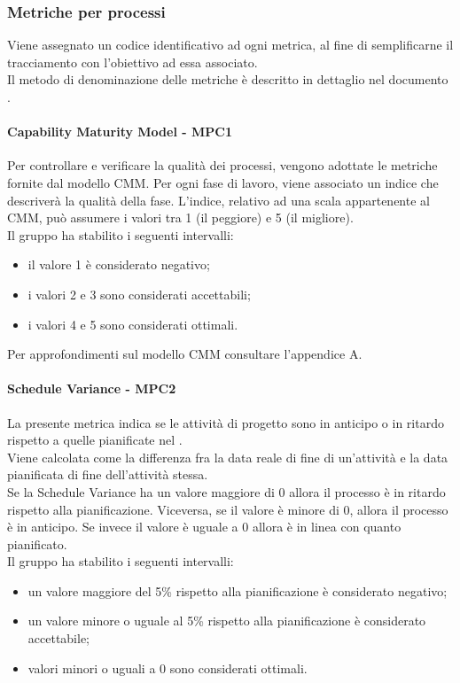 \documentclass[PianoDiQualifica.tex]{subfiles}
\begin{document}
		\subsubsection{Metriche per processi}
		Viene assegnato un codice identificativo ad ogni metrica, al fine di semplificarne il tracciamento con l'obiettivo ad essa associato. \\
		Il metodo di denominazione delle metriche è descritto in dettaglio nel documento \NPdocRR{}.
		
			\hypertarget{CMM_m}{\paragraph{Capability Maturity Model - MPC1}}
			Per controllare e verificare la qualità dei processi, vengono adottate le metriche fornite dal modello CMM.
			Per ogni fase di lavoro, viene associato un indice che descriverà la qualità della fase.
			L'indice, relativo ad una scala appartenente al CMM, può assumere i valori tra 1 (il peggiore) e 5 (il migliore). \\
			Il gruppo ha stabilito i seguenti intervalli:
			\begin{itemize}
				\item il valore 1 è considerato negativo;
				\item i valori 2 e 3 sono considerati accettabili;
				\item i valori 4 e 5 sono considerati ottimali.
			\end{itemize}
			Per approfondimenti sul modello CMM consultare l'appendice A.
			
			\hypertarget{Schedule_m}{\paragraph{Schedule Variance - MPC2}}
			La presente metrica indica se le attività di progetto sono in anticipo o in ritardo rispetto a quelle pianificate nel \PPdocRR{}. \\
			Viene calcolata come la differenza fra la data reale di fine di un’attività e la data pianificata di fine dell’attività stessa. \\
			Se la Schedule Variance ha un valore maggiore di 0 allora il processo è in ritardo rispetto alla pianificazione. Viceversa, se il valore è minore di 0, allora il processo è
			in anticipo. Se invece il valore è uguale a 0 allora è in linea con quanto pianificato. \\
			Il gruppo ha stabilito i seguenti intervalli:
			\begin{itemize}
				\item un valore maggiore del 5\% rispetto alla pianificazione è considerato negativo;
				\item un valore minore o uguale al 5\% rispetto alla pianificazione è considerato accettabile;
				\item valori minori o uguali a 0 sono considerati ottimali.
			\end{itemize}
			
\end{document}
